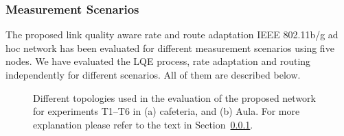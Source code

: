 \documentclass[11pt,draftclsnofoot,journal,onecolumn]{IEEEtran}
\begin{document}
\subsubsection{Measurement Scenarios}
\label{sec:indoor topology}

The proposed link quality aware rate and route adaptation IEEE 802.11b/g ad hoc network has been evaluated for different measurement scenarios using five nodes. We have evaluated the LQE process, rate adaptation and routing independently for different scenarios. All of them are described below.
\begin{figure}
\centering
{}
\caption{Different topologies used in the evaluation of the proposed network for experiments T1--T6 in (a) cafeteria, and (b) Aula. For more explanation please refer to the text in Section~\ref{sec:indoor topology}.}
\label{fig:topology_indoor}
\end{figure}
\end{document}
